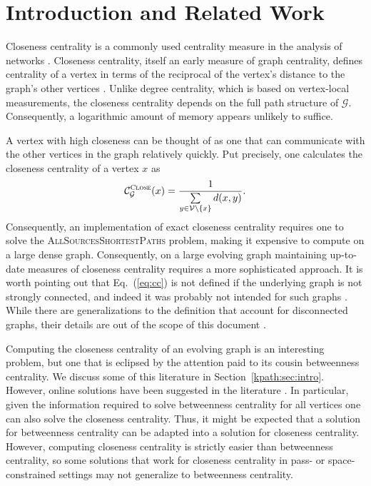 \documentclass{report}
\newcommand{\algoname}[1]{\textnormal{\textsc{#1}}}
\begin{document}
\section{Introduction and Related Work} \label{cc:sec:intro}

Closeness centrality is a commonly used centrality measure in the analysis of networks \cite{bavelas1948mathematical, wasserman1994social, boldi2014axioms, cohen2014computing, wei2014real}.
Closeness centrality, itself an early measure of graph centrality, defines centrality of a vertex in terms of the reciprocal of the vertex's distance to the graph's other vertices \cite{boldi2014axioms}. 
Unlike degree centrality, which is based on vertex-local measurements, the closeness centrality depends on the full path structure of $\mathcal{G}$.
Consequently, a logarithmic amount of memory appears unlikely to suffice.


A vertex with high closeness can be thought of as one that can communicate with the other vertices in the graph relatively quickly. 
Put precisely, one calculates the closeness centrality of a vertex $x$ as
%
\begin{equation} \label{eq:cc}
\mathcal{C}^{\algoname{Close}}_{\mathcal{G}}(x) = \frac{1}{\sum\limits_{y \in \mathcal{V} \setminus \{x\}} d(x,y)}.
\end{equation}
%
Consequently, an implementation of exact closeness centrality requires one to solve the \algoname{AllSourcesShortestPaths} problem, making it  expensive to compute on a large dense graph.
Consequently, on a large evolving graph maintaining up-to-date measures of closeness centrality requires a more sophisticated approach. 
It is worth pointing out that Eq.~(\ref{eq:cc}) is not defined if the underlying graph is not strongly connected, and indeed it was probably not intended for such graphs \cite{boldi2014axioms}. 
While there are generalizations to the definition that account for disconnected graphs, their details are out of the scope of this document .

Computing the closeness centrality of an evolving graph is an interesting problem, but one that is eclipsed by the attention paid to its cousin betweenness centrality.
We discuss some of this literature in Section~\ref{kpath:sec:intro}.
However, online solutions have been suggested in the literature \cite{wei2014real}. 
In particular, given the information required to solve betweenness centrality for all vertices one can also solve the closeness centrality.
Thus, it might be expected that a solution for betweenness centrality can be adapted into a solution for closeness centrality. 
However, computing closeness centrality is strictly easier than betweenness centrality, so some solutions that work for closeness centrality in pass- or space-constrained settings may not generalize to betweenness centrality.
\end{document}
